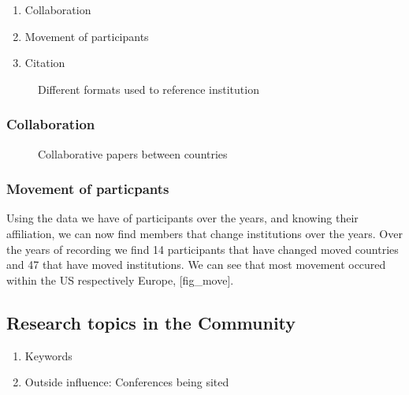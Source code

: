 \documentclass[journal,twocolumn]{IEEEtran}
\providecommand{\tightlist}{%
      \setlength{\itemsep}{0pt}\setlength{\parskip}{0pt}}
\begin{document}
\begin{enumerate}
\def\labelenumi{\arabic{enumi}.}
\tightlist
\item
  Collaboration
\item
  Movement of participants
\item
  Citation
\end{enumerate}


    \begin{figure}
        \begin{center}\end{center}
        \caption{Different formats used to reference institution}
        \label{figrep}
    \end{figure}
    
    \subsubsection{Collaboration}\label{collaboration}


    \begin{figure}
        \begin{center}\end{center}
        \caption{Collaborative papers between countries}
        \label{figcollab}
    \end{figure}
    
    \subsubsection{Movement of particpants}\label{movement-of-particpants}

Using the data we have of participants over the years, and knowing their
affiliation, we can now find members that change institutions over the
years. Over the years of recording we find 14 participants that have
changed moved countries and 47 that have moved institutions. We can see
that most movement occured within the US respectively Europe,
{[}fig\_move{]}.

    \subsection{Research topics in the
Community}\label{research-topics-in-the-community}

\begin{enumerate}
\def\labelenumi{\arabic{enumi}.}
\tightlist
\item
  Keywords
\item
  Outside influence: Conferences being sited
\end{enumerate}
\end{document}
